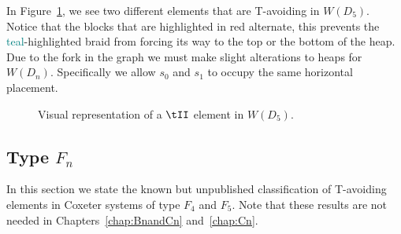 In Figure~\ref{fig:Dtavoid}, we see two different elements that are T-avoiding in $W(D_5)$. Notice that the blocks that are highlighted in \textcolor{rred}{red} alternate, this prevents the \textcolor{teal}{teal}-highlighted braid from forcing its way to the top or the bottom of the heap. Due to the fork in the graph we must make slight alterations to heaps for $W(D_n)$. Specifically we allow $s_0$ and $s_1$ to occupy the same horizontal placement. 

\begin{figure}[h!]\centering

{}
\caption{Visual representation of a $\tII$ element in $W(D_5)$.}\label{fig:Dtavoid}
\end{figure}


\subsection{Type $F_n$}

In this section we state the known but unpublished classification of T-avoiding elements in Coxeter systems of type $F_4$ and $F_5$. Note that these results are not needed in Chapters~\ref{chap:BnandCn} and~\ref{chap:Cn}. %

